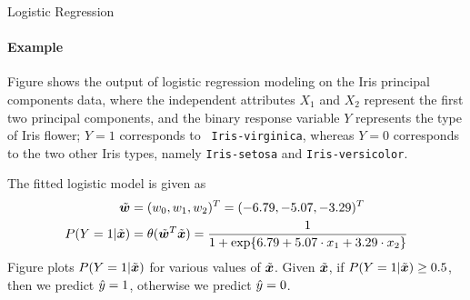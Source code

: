 \begin{frame}{Logistic Regression}
\framesubtitle{Example}
Figure shows the output of logistic
    regression modeling on the Iris principal components data, where the
    independent attributes $X_1$ and $X_2$ represent the first two
    principal components, and the binary response variable $Y$
    represents the type of Iris flower; $Y=1$ corresponds to {\tt
    Iris-virginica}, whereas $Y=0$ corresponds to the two other Iris
    types, namely {\tt Iris-setosa} and {\tt Iris-versicolor}.
   

\medskip

    The fitted logistic model is given as
    \begin{align*}
        \tilde{{\boldsymbol w}} & = (w_0, w_1, w_2)^T = (-6.79, -5.07, -3.29)^T\\
        P(Y=1|\tilde{{\boldsymbol x}}) & = \theta(\tilde{{\boldsymbol w}}^T\tilde{{\boldsymbol x}}) = 
        \frac{1}{1 + \exp\{ 6.79 + 5.07\cdot x_1 + 3.29 \cdot x_2\}}
    \end{align*}
Figure plots $P(Y=1|\tilde{{\boldsymbol x}})$ for various
    values of $\tilde{{\boldsymbol x}}$. 
%    
    Given $\tilde{{\boldsymbol x}}$, if $P(Y=1|\tilde{{\boldsymbol x}}) \ge 0.5$, then we predict $\hat{y}=1$,
    otherwise we predict $\hat{y}=0$. %
\end{frame}

